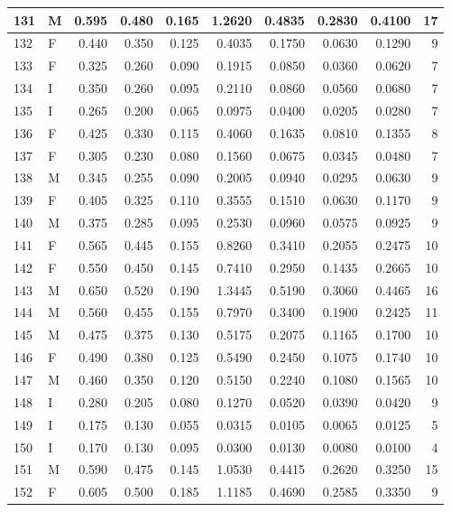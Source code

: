 \documentclass[9pt,twocolumn,twoside,]{pnas-new}
\begin{document}
\begin{tabular}{l|l|r|r|r|r|r|r|r|r}
\hline
131 & M & 0.595 & 0.480 & 0.165 & 1.2620 & 0.4835 & 0.2830 & 0.4100 & 17\\
\hline
132 & F & 0.440 & 0.350 & 0.125 & 0.4035 & 0.1750 & 0.0630 & 0.1290 & 9\\
\hline
133 & F & 0.325 & 0.260 & 0.090 & 0.1915 & 0.0850 & 0.0360 & 0.0620 & 7\\
\hline
134 & I & 0.350 & 0.260 & 0.095 & 0.2110 & 0.0860 & 0.0560 & 0.0680 & 7\\
\hline
135 & I & 0.265 & 0.200 & 0.065 & 0.0975 & 0.0400 & 0.0205 & 0.0280 & 7\\
\hline
136 & F & 0.425 & 0.330 & 0.115 & 0.4060 & 0.1635 & 0.0810 & 0.1355 & 8\\
\hline
137 & F & 0.305 & 0.230 & 0.080 & 0.1560 & 0.0675 & 0.0345 & 0.0480 & 7\\
\hline
138 & M & 0.345 & 0.255 & 0.090 & 0.2005 & 0.0940 & 0.0295 & 0.0630 & 9\\
\hline
139 & F & 0.405 & 0.325 & 0.110 & 0.3555 & 0.1510 & 0.0630 & 0.1170 & 9\\
\hline
140 & M & 0.375 & 0.285 & 0.095 & 0.2530 & 0.0960 & 0.0575 & 0.0925 & 9\\
\hline
141 & F & 0.565 & 0.445 & 0.155 & 0.8260 & 0.3410 & 0.2055 & 0.2475 & 10\\
\hline
142 & F & 0.550 & 0.450 & 0.145 & 0.7410 & 0.2950 & 0.1435 & 0.2665 & 10\\
\hline
143 & M & 0.650 & 0.520 & 0.190 & 1.3445 & 0.5190 & 0.3060 & 0.4465 & 16\\
\hline
144 & M & 0.560 & 0.455 & 0.155 & 0.7970 & 0.3400 & 0.1900 & 0.2425 & 11\\
\hline
145 & M & 0.475 & 0.375 & 0.130 & 0.5175 & 0.2075 & 0.1165 & 0.1700 & 10\\
\hline
146 & F & 0.490 & 0.380 & 0.125 & 0.5490 & 0.2450 & 0.1075 & 0.1740 & 10\\
\hline
147 & M & 0.460 & 0.350 & 0.120 & 0.5150 & 0.2240 & 0.1080 & 0.1565 & 10\\
\hline
148 & I & 0.280 & 0.205 & 0.080 & 0.1270 & 0.0520 & 0.0390 & 0.0420 & 9\\
\hline
149 & I & 0.175 & 0.130 & 0.055 & 0.0315 & 0.0105 & 0.0065 & 0.0125 & 5\\
\hline
150 & I & 0.170 & 0.130 & 0.095 & 0.0300 & 0.0130 & 0.0080 & 0.0100 & 4\\
\hline
151 & M & 0.590 & 0.475 & 0.145 & 1.0530 & 0.4415 & 0.2620 & 0.3250 & 15\\
\hline
152 & F & 0.605 & 0.500 & 0.185 & 1.1185 & 0.4690 & 0.2585 & 0.3350 & 9\\

\end{tabular}
\end{document}
